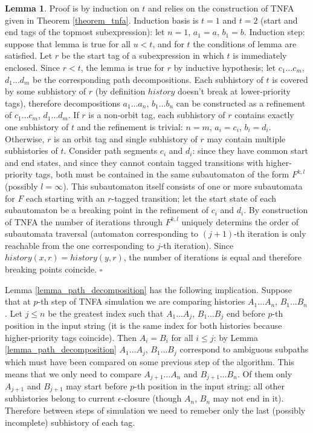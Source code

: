 \documentclass{article}
\newcommand{\Xeq}{\!=\!}
\theoremstyle{definition}
\newtheorem{XLem}{Lemma}
\begin{document}
\begin{multicols}{2}
\begin{XLem}
\smallskip

Proof is by induction on $t$ and relies on the construction of TNFA given in Theorem \ref{theorem_tnfa}.
Induction basis is $t \Xeq 1$ and $t \Xeq 2$ (start and end tags of the topmost subexpression): let $n \Xeq 1$, $a_1 \Xeq a$, $b_1 \Xeq b$.
Induction step: suppose that lemma is true for all $u \!<\! t$,
and for $t$ the conditions of lemma are satisfied.
Let $r$ be the start tag of a subexpression in which $t$ is immediately enclosed.
Since $r \!<\! t$, the lemma is true for $r$ by inductive hypothesis;
let $c_1 \dots c_m$, $d_1 \dots d_m$ be the corresponding path decompositions.
Each subhistory of $t$ is covered by some subhistory of $r$ (by definition $history$ doesn't break at lower-priority tags),
therefore decompositions $a_1 \dots a_n$, $b_1 \dots b_n$ can be constructed as a refinement of $c_1 \dots c_m$, $d_1 \dots d_m$.
If $r$ is a non-orbit tag, each subhistory of $r$ contains exactly one subhistory of $t$
and the refinement is trivial: $n \Xeq m$, $a_i \Xeq c_i$, $b_i \Xeq d_i$.
Otherwise, $r$ is an orbit tag and single subhistory of $r$ may contain multiple subhistories of $t$.
Consider path segments $c_i$ and $d_i$:
since they have common start and end states, and since they cannot contain tagged transitions with higher-priority tags,
both must be contained in the same subautomaton of the form $F^{k,l}$ (possibly $l \Xeq \infty$).
This subautomaton itself consists of one or more subautomata for $F$ each starting with an $r$-tagged transition;
let the start state of each subautomaton be a breaking point in the refinement of $c_i$ and $d_i$.
By construction of TNFA the number of iterations through $F^{k,l}$ uniquely determins the order of subautomata traversal
(automaton corresponding to $(j \!+\! 1)$-th iteration is only reachable from the one corresponding to $j$-th iteration).
Since $history(x, r) \Xeq history(y, r)$, the number of iterations is equal and
therefore breaking points coincide.
$\square$
\end{XLem}

Lemma \ref{lemma_path_decomposition} has the following implication.
Suppose that at $p$-th step of TNFA simulation we are comparing histories $A_1 \dots A_n$, $B_1 \dots B_n$.
Let $j \!\leq\! n$ be the greatest index such that $A_1 \dots A_j$, $B_1 \dots B_j$ end before $p$-th position in the input string
(it is the same index for both histories because higher-priority tags coincide).
Then $A_i \Xeq B_i$ for all $i \!\leq\! j$:
by Lemma \ref{lemma_path_decomposition} $A_1 \dots A_j$, $B_1 \dots B_j$
correspond to ambiguous subpaths which must have been compared on some previous step of the algorithm.
This means that we only need to compare $A_{j+1} \dots A_n$ and $B_{j+1} \dots B_n$.
Of them only $A_{j+1}$ and $B_{j+1}$ may start before $p$-th position in the input string:
all other subhistories belong to current $\epsilon$-closure (though $A_n$, $B_n$ may not end in it).
Therefore between steps of simulation we need to remeber only the last (possibly incomplete) subhistory of each tag.
\\


\end{multicols}
\end{document}
